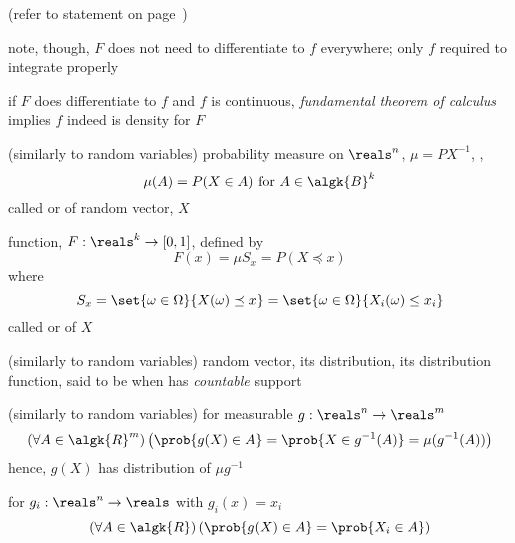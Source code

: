 \documentclass[17pt,landscape]{foils}
\newcommand{\algR}{\algk{R}}
\begin{document}
{\item []
	(refer to statement on page~\pageref{page:probability-measures-agreeing-on-P-agree-on-sigma-P})
	\bit
		\item note, though, $F$ does not need to differentiate to $f$ everywhere;
			only $f$ required to integrate properly
		\item if $F$ does differentiate to $f$ and $f$ is continuous,
			\emph{fundamental theorem of calculus} implies
			$f$ indeed is density for $F$
	\eit
\eit



\bit
\item
	(similarly to random variables) probability measure on $\reals^n$, $\mu = PX^{-1}$,
		\ie,
	\[
		\mu(A) = P(X\in A) \mbox{ for } A \in \algk{B}^k
	\]
	called  or  of random vector, $X$%

\vitem
	function, $F:\reals^k\to[0,1]$, defined by
	\[
		F(x) = \mu S_x = P(X\preceq x)
	\]
	where
	\[
		S_x = \set{\omega\in \Omega}{X(\omega)\preceq x}
		= \set{\omega\in \Omega}{X_i(\omega)\leq x_i}
	\]
	called  or  of $X$%

\vitem (similarly to random variables) random vector, its distribution, its distribution function,
	said to be %
	when has \emph{countable} support
\eit



\bit
\item
	(similarly to random variables) for measurable $g:\reals^n\to\reals^m$
	\[
		\left(
			\forall A\in\algR^{m}
		\right)
		\left(
			\prob{g(X)\in A}
				=
			\prob{X \in g^{-1}(A)}
				 =
			\mu(g^{-1}(A))
		\right)
	\]
	hence, $g(X)$ has distribution of $\mu g^{-1}$

\vitem
	for $g_i:\reals^n\to\reals$ with $g_i(x) = x_i$
	\[
		\left(
			\forall A\in\algR
		\right)
		\left(
			\prob{g(X)\in A}
				=
			\prob{X_i \in A}
		\right)
	\]

}
\end{document}
